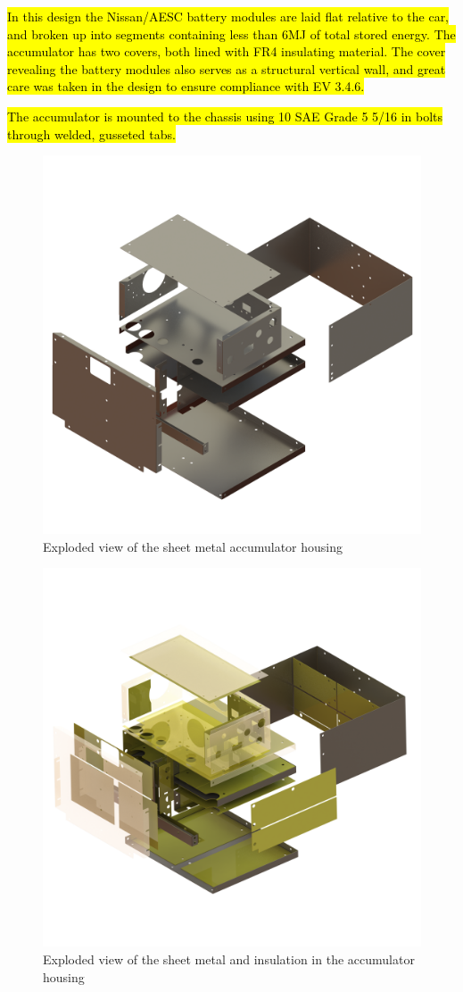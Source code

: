 \documentclass{article}
\DeclareRobustCommand{\hlr}[1]{{\sethlcolor{red}\hl{#1}}}
\begin{document}
            \hlr{In this design the Nissan/AESC battery modules are laid flat relative to the car, and broken up into segments containing less than 6MJ of total stored energy. The accumulator has two covers, both lined with FR4 insulating material. The cover revealing the battery modules also serves as a structural vertical wall, and great care was taken in the design to ensure compliance with EV 3.4.6.}

            \hlr{The accumulator is mounted to the chassis using 10 SAE Grade 5 5/16 in bolts through welded, gusseted tabs.}


            \begin{figure}[H]
                \centering
                \includegraphics[width = 0.5 \textwidth]{sheetmetal_isoview}
                \caption{Exploded view of the sheet metal accumulator housing}
                \label{cellcut}
            \end{figure}

            \begin{figure}[H]
                \centering
                \includegraphics[width = 0.5 \textwidth]{accumulator_insulation_frame_isoview}
                \caption{Exploded view of the sheet metal and insulation in the accumulator housing}
                \label{cellexp}
            \end{figure}
\end{document}
